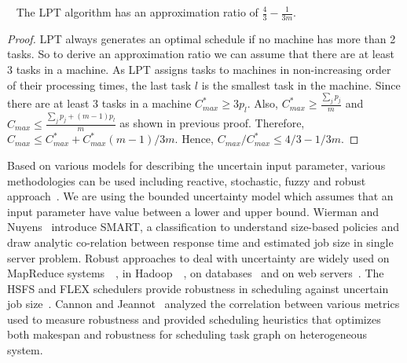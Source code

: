    \begin{property}~\citet{Graham69boundson} The LPT algorithm has an approximation ratio of $\frac{4}{3}-\frac{1}{3m}$.
   \end{property}
   \begin{proof}
   LPT always generates an optimal schedule if no machine has more than 2 tasks. So to derive an approximation ratio we can assume that there are at least 3 tasks in a machine.
   As LPT assigns tasks to machines in non-increasing order of their processing times, the last task $l$ is the smallest task in the machine. Since there are at least 3 tasks in a machine $C^*_{max}\geq 3 p_l$.
   Also, $C^*_{max} \geq \frac{\sum_{j}p_j}{m}$ and $C_{max}\leq \frac{\sum_{j}p_j + (m-1)p_l}{m} $ as shown in previous proof. Therefore,  $C_{max} \leq C^*_{max}+C^*_{max}(m-1)/3m $.  Hence, $C_{max}/C^*_{max} \leq 4/3-1/3m$. 
   \end{proof}
 
 Based on various models for describing the uncertain input parameter,
 various methodologies can be used including reactive, stochastic,
 fuzzy and robust approach~\cite{DBLP:journals/cce/LiI08}. We are using
 the bounded uncertainty model which assumes that an input parameter
 have value between a lower and upper bound.  Wierman and
 Nuyens~\cite{conf/sigmetrics/WiermanN08} introduce SMART, a
 classification to understand size-based policies and draw analytic
 co-relation between response time and estimated job size in single
 server problem. Robust approaches to deal with uncertainty are widely
 used on MapReduce
 systems~\cite{Kavulya:2010:ATP:1844765.1845224}~\cite{Verma:2011:AAR:1998582.1998637},
 in
 Hadoop~\cite{Wolf:2010:FSA:2023718.2023720}~\cite{White:2009:HDG:1717298},
 on databases~\cite{Lipton199518} and on web
 servers~\cite{Cardellini99dynamicload}. The HSFS and FLEX schedulers
 provide robustness in scheduling against uncertain job
 size~\cite{Wolf:2010:FSA:2023718.2023720,6691554}. Cannon and
 Jeannot~\cite{cj09c} analyzed the correlation between various metrics
 used to measure robustness and provided scheduling heuristics that
 optimizes both makespan and robustness for scheduling task graph on
 heterogeneous system.
 
